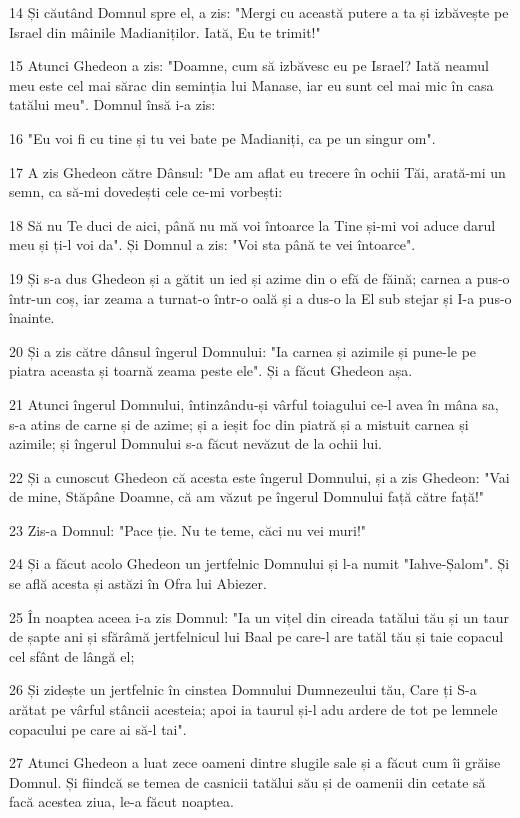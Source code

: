 \par 14 Și căutând Domnul spre el, a zis: "Mergi cu această putere a ta și izbăvește pe Israel din mâinile Madianiților. Iată, Eu te trimit!"
\par 15 Atunci Ghedeon a zis: "Doamne, cum să izbăvesc eu pe Israel? Iată neamul meu este cel mai sărac din seminția lui Manase, iar eu sunt cel mai mic în casa tatălui meu". Domnul însă i-a zis:
\par 16 "Eu voi fi cu tine și tu vei bate pe Madianiți, ca pe un singur om".
\par 17 A zis Ghedeon către Dânsul: "De am aflat eu trecere în ochii Tăi, arată-mi un semn, ca să-mi dovedești cele ce-mi vorbești:
\par 18 Să nu Te duci de aici, până nu mă voi întoarce la Tine și-mi voi aduce darul meu și ți-l voi da". Și Domnul a zis: "Voi sta până te vei întoarce".
\par 19 Și s-a dus Ghedeon și a gătit un ied și azime din o efă de făină; carnea a pus-o într-un coș, iar zeama a turnat-o într-o oală și a dus-o la El sub stejar și I-a pus-o înainte.
\par 20 Și a zis către dânsul îngerul Domnului: "Ia carnea și azimile și pune-le pe piatra aceasta și toarnă zeama peste ele". Și a făcut Ghedeon așa.
\par 21 Atunci îngerul Domnului, întinzându-și vârful toiagului ce-l avea în mâna sa, s-a atins de carne și de azime; și a ieșit foc din piatră și a mistuit carnea și azimile; și îngerul Domnului s-a făcut nevăzut de la ochii lui.
\par 22 Și a cunoscut Ghedeon că acesta este îngerul Domnului, și a zis Ghedeon: "Vai de mine, Stăpâne Doamne, că am văzut pe îngerul Domnului față către față!"
\par 23 Zis-a Domnul: "Pace ție. Nu te teme, căci nu vei muri!"
\par 24 Și a făcut acolo Ghedeon un jertfelnic Domnului și l-a numit "Iahve-Șalom". Și se află acesta și astăzi în Ofra lui Abiezer.
\par 25 În noaptea aceea i-a zis Domnul: "Ia un vițel din cireada tatălui tău și un taur de șapte ani și sfărâmă jertfelnicul lui Baal pe care-l are tatăl tău și taie copacul cel sfânt de lângă el;
\par 26 Și zidește un jertfelnic în cinstea Domnului Dumnezeului tău, Care ți S-a arătat pe vârful stâncii acesteia; apoi ia taurul și-l adu ardere de tot pe lemnele copacului pe care ai să-l tai".
\par 27 Atunci Ghedeon a luat zece oameni dintre slugile sale și a făcut cum îi grăise Domnul. Și fiindcă se temea de casnicii tatălui său și de oamenii din cetate să facă acestea ziua, le-a făcut noaptea.

